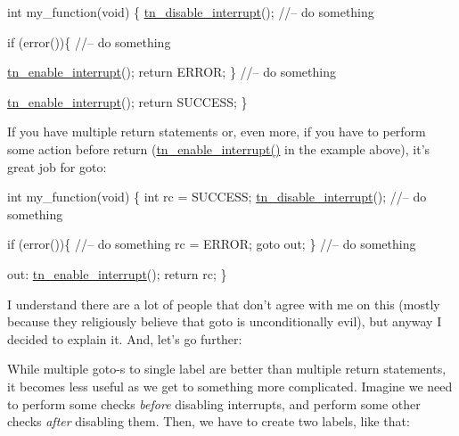 \begin{DoxyCode}
\textcolor{keywordtype}{int} my\_function(\textcolor{keywordtype}{void})
\{
   \hyperlink{tn__oldsymbols_8h_a27bf94f93625fa36125c3fa3ae6b4041}{tn\_disable\_interrupt}();
   \textcolor{comment}{//-- do something}

   \textcolor{keywordflow}{if} (error())\{
      \textcolor{comment}{//-- do something}

      \hyperlink{tn__oldsymbols_8h_acc85567ca09ede9cf2d58717506def46}{tn\_enable\_interrupt}();
      \textcolor{keywordflow}{return} ERROR;
   \}
   \textcolor{comment}{//-- do something}

   \hyperlink{tn__oldsymbols_8h_acc85567ca09ede9cf2d58717506def46}{tn\_enable\_interrupt}();
   \textcolor{keywordflow}{return} SUCCESS;
\}
\end{DoxyCode}


If you have multiple {\ttfamily return} statements or, even more, if you have to perform some action before return ({\ttfamily \hyperlink{tn__oldsymbols_8h_acc85567ca09ede9cf2d58717506def46}{tn\+\_\+enable\+\_\+interrupt()}} in the example above), it's great job for {\ttfamily goto}\+:


\begin{DoxyCode}
\textcolor{keywordtype}{int} my\_function(\textcolor{keywordtype}{void})
\{
   \textcolor{keywordtype}{int} rc = SUCCESS;
   \hyperlink{tn__oldsymbols_8h_a27bf94f93625fa36125c3fa3ae6b4041}{tn\_disable\_interrupt}();
   \textcolor{comment}{//-- do something}

   \textcolor{keywordflow}{if} (error())\{
      \textcolor{comment}{//-- do something}
      rc = ERROR;
      \textcolor{keywordflow}{goto} out;
   \}
   \textcolor{comment}{//-- do something}

out:
   \hyperlink{tn__oldsymbols_8h_acc85567ca09ede9cf2d58717506def46}{tn\_enable\_interrupt}();
   \textcolor{keywordflow}{return} rc;
\}
\end{DoxyCode}


I understand there are a lot of people that don't agree with me on this (mostly because they religiously believe that {\ttfamily goto} is unconditionally evil), but anyway I decided to explain it. And, let's go further\+:

While multiple {\ttfamily goto}-\/s to single label are better than multiple {\ttfamily return} statements, it becomes less useful as we get to something more complicated. Imagine we need to perform some checks {\itshape before} disabling interrupts, and perform some other checks {\itshape after} disabling them. Then, we have to create two labels, like that\+:


